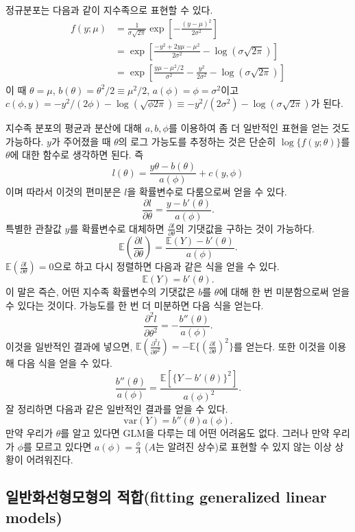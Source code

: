 \documentclass[b5paper,]{scrbook}
\theoremstyle{plain}
\theoremstyle{definition}
\numberwithin{equation}{section}
\let\BeginKnitrBlock\begin \let\EndKnitrBlock\end
\begin{document}
\BeginKnitrBlock{example}[정규분포는 지수족의 멤버]
\protect\hypertarget{exm:unnamed-chunk-204}{}{\label{exm:unnamed-chunk-204} {} }정규분포는 다음과 같이 지수족으로 표현할 수 있다.
\begin{align*}
f(y;\mu)&=\frac{1}{\sigma\sqrt{2\pi}}\exp[-\frac{(y-\mu)^{2}}{2\sigma^{2}}]\\
&=\exp[\frac{-y^{2}+2y\mu -\mu^{2}}{2\sigma^{2}}-\log (\sigma\sqrt{2\pi})]\\
&=\exp[\frac{y\mu -\mu^{2}/2}{\sigma^{2}}-\frac{y^{2}}{2\sigma^{2}}-\log (\sigma\sqrt{2\pi})]
\end{align*}
이 때 \(\theta=\mu\), \(b(\theta)=\theta^{2}/2\equiv \mu^{2}/2\), \(a(\phi)=\phi=\sigma^{2}\)이고 \(c(\phi,y)=-y^{2}/(2\phi) -\log(\sqrt{\phi 2\pi})\equiv -y^{2}/(2\sigma^{2})-\log(\sigma\sqrt{2\pi})\)가 된다.
\EndKnitrBlock{example}

지수족 분포의 평균과 분산에 대해 \(a,b,\phi\)를 이용하여 좀 더 일반적인 표현을 얻는 것도 가능하다. \(y\)가 주어졌을 때 \(\theta\)의 로그 가능도를 추정하는 것은 단순히 \(\log\{f(y;\theta)\}\)를 \(\theta\)에 대한 함수로 생각하면 된다. 즉
\[l(\theta)= \frac{y\theta-b(\theta)}{a(\phi)} +c(y,\phi)\]
이며 따라서 이것의 편미분은 \(l\)을 확률변수로 다룸으로써 얻을 수 있다.
\[\frac{\partial l}{\partial \theta}=\frac{y-b'(\theta)}{a(\phi)}.\]
특별한 관찰값 \(y\)를 확률변수로 대체하면 \(\frac{\partial l}{\partial \theta}\)의 기댓값을 구하는 것이 가능하다.
\[\mathbb{E}(\frac{\partial l}{\partial \theta})=\frac{\mathbb{E}(Y)-b'(\theta)}{a(\phi)}.\]
\(\mathbb{E}(\frac{\partial l}{\partial \theta})=0\)으로 하고 다시 정렬하면 다음과 같은 식을 얻을 수 있다.
\[\mathbb{E}(Y)=b'(\theta).\]
이 말은 즉슨, 어떤 지수족 확률변수의 기댓값은 \(b\)를 \(\theta\)에 대해 한 번 미분함으로써 얻을 수 있다는 것이다. 가능도를 한 번 더 미분하면 다음 식을 얻는다.
\[\frac{\partial^{2} l}{\partial \theta^{2}}=-\frac{b''(\theta)}{a(\phi)}.\]
이것을 일반적인 결과에 넣으면, \(\mathbb{E}(\frac{\partial^{2} l}{\partial \theta^{2}})=-\mathbb{E}\{(\frac{\partial l}{\partial \theta})^{2}\}\)를 얻는다. 또한 이것을 이용해 다음 식을 얻을 수 있다.
\[\frac{b''(\theta)}{a(\phi)}=\frac{\mathbb{E}[\{Y-b'(\theta)\}^{2}]}{a(\phi)^{2}}.\]
잘 정리하면 다음과 같은 일반적인 결과를 얻을 수 있다.
\[\text{var}(Y)=b''(\theta)a(\phi).\]
만약 우리가 \(\theta\)를 알고 있다면 GLM을 다루는 데 어떤 어려움도 없다. 그러나 만약 우리가 \(\phi\)를 모르고 있다면 \(a(\phi)=\frac{\phi}{A}\) (\(A\)는 알려진 상수)로 표현할 수 있지 않는 이상 상황이 어려워진다.

\hypertarget{-fitting-generalized-linear-models}{%
\subsection{일반화선형모형의 적합(fitting generalized linear models)}\label{-fitting-generalized-linear-models}}
\end{document}

